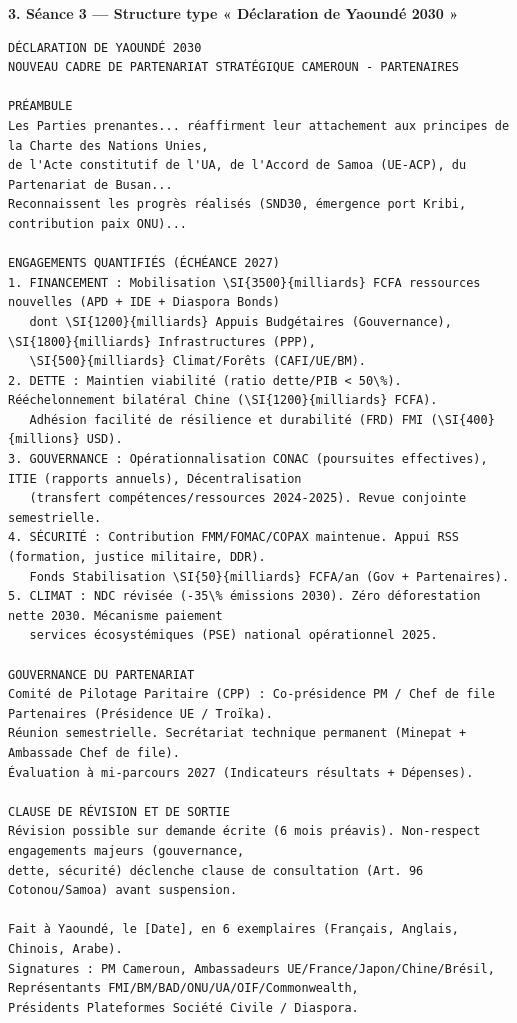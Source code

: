 \documentclass[11pt]{article}
\begin{document}
\begin{exoresolu}
\textbf{3. Séance 3 — Structure type « Déclaration de Yaoundé 2030 »}
\begin{verbatim}
DÉCLARATION DE YAOUNDÉ 2030
NOUVEAU CADRE DE PARTENARIAT STRATÉGIQUE CAMEROUN - PARTENAIRES

PRÉAMBULE
Les Parties prenantes... réaffirment leur attachement aux principes de la Charte des Nations Unies,
de l'Acte constitutif de l'UA, de l'Accord de Samoa (UE-ACP), du Partenariat de Busan...
Reconnaissent les progrès réalisés (SND30, émergence port Kribi, contribution paix ONU)...

ENGAGEMENTS QUANTIFIÉS (ÉCHÉANCE 2027)
1. FINANCEMENT : Mobilisation \SI{3500}{milliards} FCFA ressources nouvelles (APD + IDE + Diaspora Bonds)
   dont \SI{1200}{milliards} Appuis Budgétaires (Gouvernance), \SI{1800}{milliards} Infrastructures (PPP),
   \SI{500}{milliards} Climat/Forêts (CAFI/UE/BM).
2. DETTE : Maintien viabilité (ratio dette/PIB < 50\%). Rééchelonnement bilatéral Chine (\SI{1200}{milliards} FCFA).
   Adhésion facilité de résilience et durabilité (FRD) FMI (\SI{400}{millions} USD).
3. GOUVERNANCE : Opérationnalisation CONAC (poursuites effectives), ITIE (rapports annuels), Décentralisation
   (transfert compétences/ressources 2024-2025). Revue conjointe semestrielle.
4. SÉCURITÉ : Contribution FMM/FOMAC/COPAX maintenue. Appui RSS (formation, justice militaire, DDR).
   Fonds Stabilisation \SI{50}{milliards} FCFA/an (Gov + Partenaires).
5. CLIMAT : NDC révisée (-35\% émissions 2030). Zéro déforestation nette 2030. Mécanisme paiement
   services écosystémiques (PSE) national opérationnel 2025.

GOUVERNANCE DU PARTENARIAT
Comité de Pilotage Paritaire (CPP) : Co-présidence PM / Chef de file Partenaires (Présidence UE / Troïka).
Réunion semestrielle. Secrétariat technique permanent (Minepat + Ambassade Chef de file).
Évaluation à mi-parcours 2027 (Indicateurs résultats + Dépenses).

CLAUSE DE RÉVISION ET DE SORTIE
Révision possible sur demande écrite (6 mois préavis). Non-respect engagements majeurs (gouvernance,
dette, sécurité) déclenche clause de consultation (Art. 96 Cotonou/Samoa) avant suspension.

Fait à Yaoundé, le [Date], en 6 exemplaires (Français, Anglais, Chinois, Arabe).
Signatures : PM Cameroun, Ambassadeurs UE/France/Japon/Chine/Brésil, Représentants FMI/BM/BAD/ONU/UA/OIF/Commonwealth,
Présidents Plateformes Société Civile / Diaspora.
\end{verbatim}


\end{exoresolu}
\end{document}
